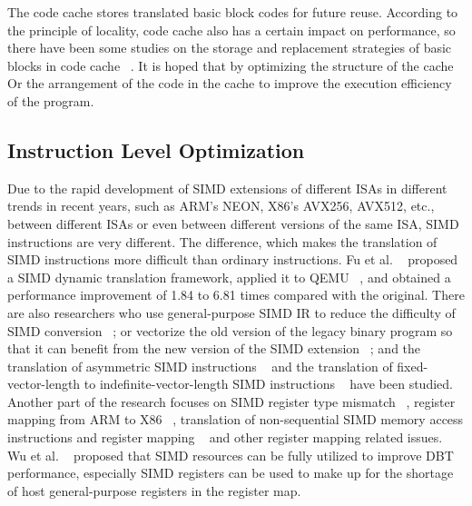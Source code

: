 The code cache stores translated basic block codes for future reuse.
According to the principle of locality, code cache also has a certain impact on performance, so there have been some studies on the storage and replacement strategies of basic blocks in code cache ~\cite{Reddi2007PersistentCC}\cite{ChenWei2014}\cite{Wang2016AGP}.
It is hoped that by optimizing the structure of the cache Or the arrangement of the code in the cache to improve the execution efficiency of the program.

\subsection{Instruction Level Optimization}
Due to the rapid development of SIMD extensions of different ISAs in different trends in recent years, such as ARM's NEON, X86's AVX256, AVX512, etc., between different ISAs or even between different versions of the same ISA, SIMD instructions are very different.
The difference, which makes the translation of SIMD instructions more difficult than ordinary instructions.
Fu et al. ~\cite{Fu2018EfficientAR} proposed a SIMD dynamic translation framework, applied it to QEMU ~\cite{DBLP:conf/usenix/Bellard05}, and obtained a performance improvement of 1.84 to 6.81 times compared with the original.
There are also researchers who use general-purpose SIMD IR to reduce the difficulty of SIMD conversion ~\cite{Michel2011SpeedingupSI}\cite{Fu2015ImprovingSC}; or vectorize the old version of the legacy binary program so that it can benefit from the new version of the SIMD extension ~\cite{Lin2019ExploitingVP}; and the translation of asymmetric SIMD instructions ~\cite{Liu2019ExploitingSA} and the translation of fixed-vector-length to indefinite-vector-length SIMD instructions ~\cite{Fu2019TranslatingTS} have been studied.
Another part of the research focuses on SIMD register type mismatch ~\cite{Li2006OptimizingDB}, register mapping from ARM to X86 ~\cite{Liu2017ExploitingAS}\cite{Hong2018ImprovingSP}, translation of non-sequential SIMD memory access instructions and register mapping ~\cite{Fu2017DynamicTO} and other register mapping related issues.
Wu et al. ~\cite{Wu2021EffectiveEO} proposed that SIMD resources can be fully utilized to improve DBT performance, especially SIMD registers can be used to make up for the shortage of host general-purpose registers in the register map.

